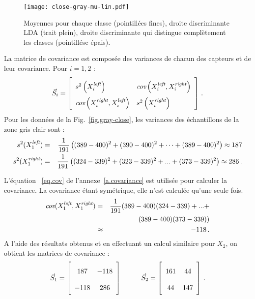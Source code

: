 \begin{figure}
\begin{center}
\texttt{[image: close-gray-mu-lin.pdf]}
\caption{Moyennes pour chaque classe (pointillées fines), droite discriminante LDA (trait plein), droite discriminante qui distingue complètement les classes (pointillése épais).}
\label{fig.gray-close-mu-lin}
\end{center}
\end{figure}

La matrice de covariance est composée des variances de chacun des capteurs et de leur covariance. Pour $i=1,2$ :
\[
\vec{S}_i = \left[
\renewcommand{\arraystretch}{2}
\begin{array}{l@{\hspace{1em}}l}
s^2\left(X_i^{\sub{left}}\right) &
\textit{cov}\left(X_i^{\sub{left}}, X_i^{\sub{right}}\right)\\
\textit{cov}\left(X_i^{\sub{right}},X_i^{\sub{left}}\right)&
s^2\left(X_i^{\sub{right}}\right)
\end{array}
\right]\,.
\]
Pour les données de la Fig.~\ref{fig.gray-close}, les variances des échantillons de la zone gris clair sont :
\begin{eqnarray*}
s^2(X_1^{\textit{\scriptsize left}}) &=& \frac{1}{191} \left((389 - 400)^2 + (390 - 400)^2 + \cdots + (389 - 400)^2 \right) \approx 187 \\
s^2(X_1^{\textit{\scriptsize right}}) &=& \frac{1}{191} \left((324 - 339)^2 + (323 - 339)^2 + ... + (373 - 339)^2 \right) \approx 286\,.
\end{eqnarray*}

L'équation ~\ref{eq.cov} de l'annexe~\ref{a.covariance} est utilisée pour calculer la covariance. La covariance étant symétrique, elle n'est calculée qu'une seule fois.
\begin{eqnarray*}
\textit{cov}(X_1^{\textit{\scriptsize left}}, X_1^{\textit{\scriptsize right}}) &=& \frac{1}{191}(389 - 400)(324 - 339) + ... +\\
&&\qquad (389 - 400)(373 - 339) )\\
&\approx& -118\,.
\end{eqnarray*}
A l'aide des résultats obtenus et en effectuant un calcul similaire pour $X_2$, on obtient les matrices de covariance :
\[
\vec{S}_1 = \left[ \begin{array}{c} 187\\-118\end{array} \begin{array}{c} -118\\286 \end{array}\right]
\hspace{10mm}
\vec{S}_2 = \left[ \begin{array}{c} 161\\44\end{array} \begin{array}{c} 44\\147 \end{array}\right]\,.
\]

